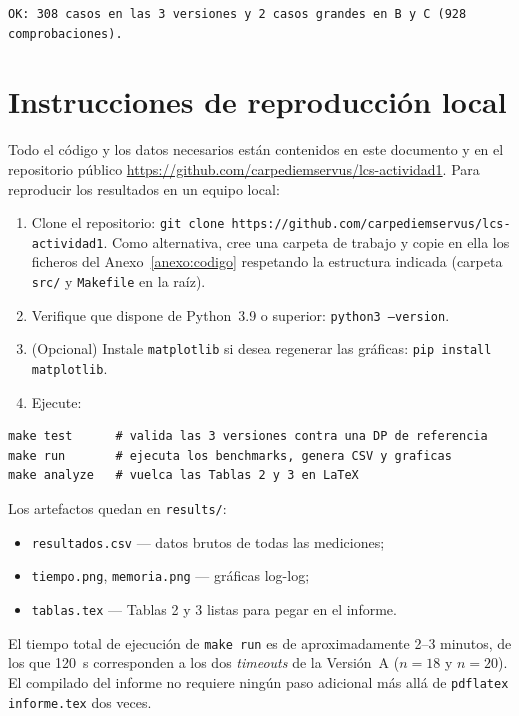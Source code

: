 \documentclass[11pt,a4paper]{article}
\begin{document}
\begin{lstlisting}[style=txt, caption={Salida de \texttt{make test}}]
OK: 308 casos en las 3 versiones y 2 casos grandes en B y C (928 comprobaciones).
\end{lstlisting}

\section{Instrucciones de reproducción local}\label{anexo:repro}

Todo el código y los datos necesarios están contenidos en este
documento y en el repositorio público
\url{https://github.com/carpediemservus/lcs-actividad1}. Para reproducir
los resultados en un equipo local:

\begin{enumerate}
    \item Clone el repositorio:
          \texttt{git clone https://github.com/carpediemservus/lcs-actividad1}.
          Como alternativa, cree una carpeta de trabajo y copie en ella los
          ficheros del Anexo~\ref{anexo:codigo} respetando la estructura
          indicada (carpeta \texttt{src/} y \texttt{Makefile} en la raíz).
    \item Verifique que dispone de Python~3.9 o superior:
          \texttt{python3 --version}.
    \item (Opcional) Instale \texttt{matplotlib} si desea regenerar las
          gráficas: \texttt{pip install matplotlib}.
    \item Ejecute:
\end{enumerate}

\begin{verbatim}
make test      # valida las 3 versiones contra una DP de referencia
make run       # ejecuta los benchmarks, genera CSV y graficas
make analyze   # vuelca las Tablas 2 y 3 en LaTeX
\end{verbatim}

Los artefactos quedan en \texttt{results/}:

\begin{itemize}
    \item \texttt{resultados.csv} — datos brutos de todas las mediciones;
    \item \texttt{tiempo.png}, \texttt{memoria.png} — gráficas log-log;
    \item \texttt{tablas.tex} — Tablas 2 y 3 listas para pegar en el
          informe.
\end{itemize}

El tiempo total de ejecución de \texttt{make run} es de
aproximadamente 2--3 minutos, de los que 120~s corresponden a los dos
\emph{timeouts} de la Versión~A ($n=18$ y $n=20$). El compilado del informe no requiere ningún paso
adicional más allá de \texttt{pdflatex informe.tex} dos veces.
\end{document}

